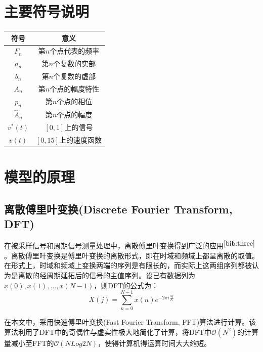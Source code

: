 \documentclass[bwprint]{cumcmthesis}
\begin{document}
    \section{主要符号说明}
        \begin{center}
            \begin{tabular}{cc}
                \hline
                符号	&  意义 \\ \hline
                $F_n$ & 第$n$个点代表的频率 \\ 
                $a_n$ & 第$n$个复数的实部 \\ 
                $b_n$ & 第$n$个复数的虚部 \\ 
                $A_n$ & 第$n$个点的幅度特性 \\ 
                $p_n$ & 第$n$个点的相位 \\
                $\widehat{A}_n$ & 第$n$个点的幅度 \\ 
                $v^*(t)$ & $[0,1]$上的信号 \\ 
                $v(t)$ & $[0,15]$上的速度函数 \\
                \hline
            \end{tabular}
        \end{center}
    \section{模型的原理}
        \subsection{离散傅里叶变换(Discrete Fourier Transform, DFT)}
        在被采样信号和周期信号测量处理中，离散傅里叶变换得到广泛的应用$^{\cite{bib:three}}$。离散傅里叶变换是傅里叶变换的离散形式，即在时域和频域上都呈离散的取值。在形式上，时域和频域上变换两端的序列是有限长的，而实际上这两组序列都被认为是离散的经周期延拓后的信号的主值序列。设已有数据列为$x(0),x(1),\dots,x(N-1)$，则DFT的公式为：
        \begin{equation}
            \label{eq:DFT}
            X(j) = \sum_{n=0}^{N-1}x(n)e^{-2\pi i\frac{nj}{N}}
        \end{equation}
        
        在本文中，采用快速傅里叶变换(Fast Fourier Transform, FFT)算法进行计算。该算法利用了DFT中的奇偶性与虚实性极大地简化了计算，将DFT中$\mathcal{O}(N^2)$的计算量减小至FFT的$\mathcal{O}(NLog2N)$，使得计算机得运算时间大大缩短。
\end{document}

